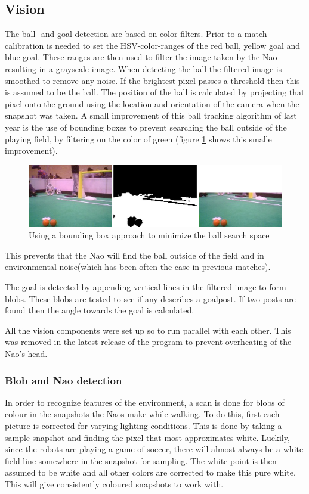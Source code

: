 \documentclass[a4paper]{article}
\begin{document}
\subsection{Vision}
\label{sec:vision}
The ball- and goal-detection are based on color filters. Prior to a match calibration is needed to set the HSV-color-ranges of the red ball, yellow goal and blue goal. These ranges are then used to filter the image taken by the Nao resulting in a grayscale image. When detecting the ball the filtered image is smoothed to remove any noise. If the brightest pixel passes a threshold then this is assumed to be the ball. The position of the ball is calculated by projecting that pixel onto the ground using the location and orientation of the camera when the snapshot was taken. A small improvement of this ball tracking algorithm of last year is the use of bounding boxes to prevent searching the ball outside of the playing field, by filtering on the color of green (figure \ref{fig:boundbox_ball} shows this smalle improvement). 

\begin{figure}[htb]    	
\centering
\includegraphics[width=0.8\columnwidth]{boundbox.png} %
\caption{Using a bounding box approach to minimize the ball search space} %
\label{fig:boundbox_ball}
\end{figure}

This prevents that the Nao will find the ball outside of the field and in environmental noise(which has been often the case in previous matches).

The goal is detected by appending vertical lines in the filtered image to form blobs. These blobs are tested to see if any describes a goalpost. If two posts are found then the angle towards the goal is calculated.

All the vision components were set up so to run parallel with each other. This was removed in the latest release of the program to prevent overheating of the Nao's head.  

\subsubsection{Blob and Nao detection}
In order to recognize features of the environment, a scan is done for blobs of colour in the snapshots the Naos make while walking. To do this, first each picture is corrected for varying lighting conditions. This is done by taking a sample snapshot and finding the pixel that most approximates white. Luckily, since the robots are playing a game of soccer, there will almost always be a white field line somewhere in the snapshot for sampling. The white point is then assumed to be white and all other colors are corrected to make this pure white. This will give consistently coloured snapshots to work with.
\end{document}
